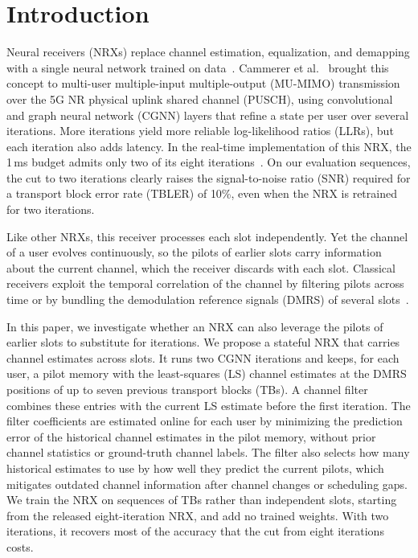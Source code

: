 \section{Introduction}
Neural receivers (NRXs) replace channel estimation, equalization, and demapping with a single neural network trained on data~\cite{honkala2021deeprx}. Cammerer et al.~\cite{cammerer2023neural} brought this concept to multi-user multiple-input multiple-output (MU-MIMO) transmission over the 5G NR physical uplink shared channel (PUSCH), using convolutional and graph neural network (CGNN) layers that refine a state per user over several iterations. More iterations yield more reliable log-likelihood ratios (LLRs), but each iteration also adds latency. In the real-time implementation of this NRX, the 1\,ms budget admits only two of its eight iterations~\cite{wiesmayr2025realtime}. On our evaluation sequences, the cut to two iterations clearly raises the signal-to-noise ratio (SNR) required for a transport block error rate (TBLER) of 10\%, even when the NRX is retrained for two iterations.

Like other NRXs, this receiver processes each slot independently. Yet the channel of a user evolves continuously, so the pilots of earlier slots carry information about the current channel, which the receiver discards with each slot. Classical receivers exploit the temporal correlation of the channel by filtering pilots across time or by bundling the demodulation reference signals (DMRS) of several slots~\cite{hoeher1997wiener,3gpp38214}.

In this paper, we investigate whether an NRX can also leverage the pilots of earlier slots to substitute for iterations. We propose a stateful NRX that carries channel estimates across slots. It runs two CGNN iterations and keeps, for each user, a pilot memory with the least-squares (LS) channel estimates at the DMRS positions of up to seven previous transport blocks (TBs). A channel filter combines these entries with the current LS estimate before the first iteration. The filter coefficients are estimated online for each user by minimizing the prediction error of the historical channel estimates in the pilot memory, without prior channel statistics or ground-truth channel labels. The filter also selects how many historical estimates to use by how well they predict the current pilots, which mitigates outdated channel information after channel changes or scheduling gaps. We train the NRX on sequences of TBs rather than independent slots, starting from the released eight-iteration NRX, and add no trained weights. With two iterations, it recovers most of the accuracy that the cut from eight iterations costs.


